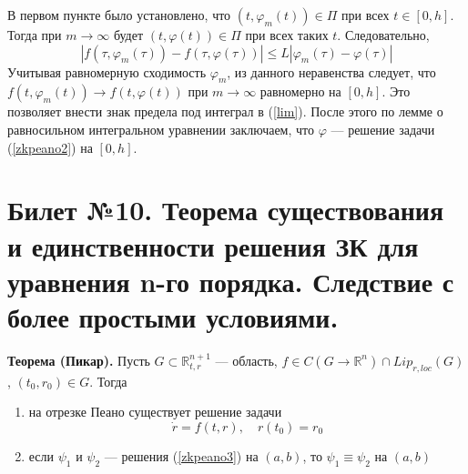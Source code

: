 \documentclass{article}
\begin{document}
\begin{enumerate}
    В первом пункте было установлено, что $(t, \varphi_m(t)) \in \Pi$ при всех $t \in [0,h]$. Тогда при $m \to \infty$ будет $(t, \varphi(t)) \in \Pi$ при всех таких $t$. Следовательно,
    \begin{equation*}
        |f(\tau, \varphi_m(\tau)) - f(\tau, \varphi(\tau))| \le L|\varphi_m(\tau) - \varphi(\tau)|
    \end{equation*}
    Учитывая равномерную сходимость $\varphi_m$, из данного неравенства следует, что $f(t, \varphi_m(t)) \to f(t, \varphi(t))$ при $m \to \infty$ равномерно на $[0,h]$. Это позволяет внести знак предела под интеграл в (\ref{lim}). После этого по лемме о равносильном интегральном уравнении заключаем, что $\varphi$ --- решение задачи (\ref{zkpeano2}) на $[0,h]$.
\end{enumerate}

\section{Билет №10. Теорема существования и единственности решения ЗК для уравнения n-го
порядка. Следствие с более простыми условиями.}
\textbf{Теорема (Пикар).} Пусть $G \subset \mathbb{R}_{t,r}^{n+1}$ --- область, $f \in C(G \to \mathbb{R}^n) \cap Lip_{r,loc}(G)$, $(t_0, r_0) \in G$. Тогда
\begin{enumerate}
    \item на отрезке Пеано существует решение задачи
    \begin{equation}
        \dot{r} = f(t,r), \quad r(t_0) = r_0 \label{zkpeano3}
    \end{equation}
    \item если $\psi_1$ и $\psi_2$ --- решения (\ref{zkpeano3}) на $(a,b)$, то $\psi_1 \equiv \psi_2$ на $(a,b)$
\end{enumerate}
\end{document}
